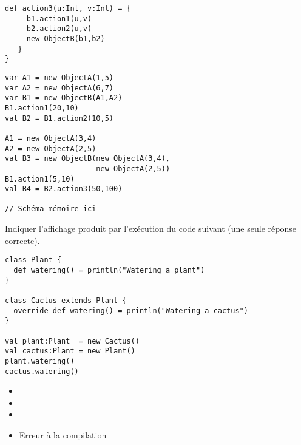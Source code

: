 \documentclass[a4paper,10pt]{article}
\begin{document}
\begin{Question}
\begin{multicols}{2}
\begin{minipage}{\linewidth}
\begin{Verbatim}[fontsize=\footnotesize, firstnumber=12]
   def action3(u:Int, v:Int) = {
     b1.action1(u,v)
     b2.action2(u,v)
     new ObjectB(b1,b2)     
   }
}
\end{Verbatim}
\end{minipage}

\begin{minipage}{\linewidth}
\begin{Verbatim}[fontsize=\footnotesize, firstnumber=last]
var A1 = new ObjectA(1,5)
var A2 = new ObjectA(6,7)
var B1 = new ObjectB(A1,A2)
B1.action1(20,10)
val B2 = B1.action2(10,5)

A1 = new ObjectA(3,4)
A2 = new ObjectA(2,5)
val B3 = new ObjectB(new ObjectA(3,4), 
                     new ObjectA(2,5))
B1.action1(5,10)
val B4 = B2.action3(50,100)

// Schéma mémoire ici
\end{Verbatim}
\end{minipage}
\end{multicols}
\end{Question}

\begin{Question}
Indiquer l'affichage produit par l'exécution du code suivant (une seule
réponse correcte).
\smallskip

\begin{minipage}{.6\linewidth}
\begin{Verbatim}[fontsize=\footnotesize]
class Plant {
  def watering() = println("Watering a plant")
}

class Cactus extends Plant {
  override def watering() = println("Watering a cactus")
}

val plant:Plant  = new Cactus()
val cactus:Plant = new Plant()
plant.watering()
cactus.watering()
\end{Verbatim}
\end{minipage}
%
\begin{minipage}{.4\linewidth}
\begin{itemize}
\item[Réponse 1:] 
\item[Réponse 2:] 
\item[Réponse 3:] 
\item[Réponse 4:] Erreur à la compilation
\end{itemize}
\end{minipage}
\end{Question}
\end{document}
